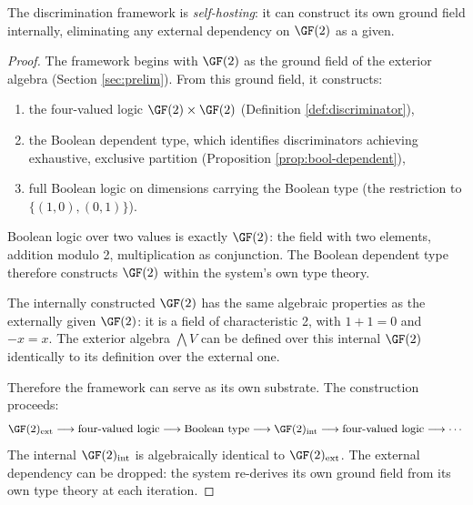 \begin{theorem}\label{thm:self-hosting}
The discrimination framework is \emph{self-hosting}:
it can construct its own ground field internally, eliminating
any external dependency on $\GF(2)$ as a given.
\end{theorem}

\begin{proof}
The framework begins with $\GF(2)$ as the ground field of
the exterior algebra (Section \ref{sec:prelim}). From this
ground field, it constructs:
\begin{enumerate}[label=(\roman*),nosep]
  \item the four-valued logic $\GF(2) \times \GF(2)$
    (Definition \ref{def:discriminator}),
  \item the Boolean dependent type, which identifies
    discriminators achieving exhaustive, exclusive
    partition (Proposition \ref{prop:bool-dependent}),
  \item full Boolean logic on dimensions carrying the
    Boolean type (the restriction to $\{(1,0), (0,1)\}$).
\end{enumerate}

Boolean logic over two values is exactly $\GF(2)$: the
field with two elements, addition modulo 2, multiplication
as conjunction. The Boolean dependent type therefore
constructs $\GF(2)$ within the system's own type theory.

The internally constructed $\GF(2)$ has the same algebraic
properties as the externally given $\GF(2)$: it is a field
of characteristic 2, with $1 + 1 = 0$ and $-x = x$.
The exterior algebra $\bigwedge V$ can be defined over
this internal $\GF(2)$ identically to its definition over
the external one.

Therefore the framework can serve as its own substrate.
The construction proceeds:
\[
  \GF(2)_{\mathrm{ext}} \longrightarrow
  \text{four-valued logic} \longrightarrow
  \text{Boolean type} \longrightarrow
  \GF(2)_{\mathrm{int}} \longrightarrow
  \text{four-valued logic} \longrightarrow \cdots
\]
The internal $\GF(2)_{\mathrm{int}}$ is algebraically
identical to $\GF(2)_{\mathrm{ext}}$. The external
dependency can be dropped: the system re-derives its own
ground field from its own type theory at each iteration.
\end{proof}

